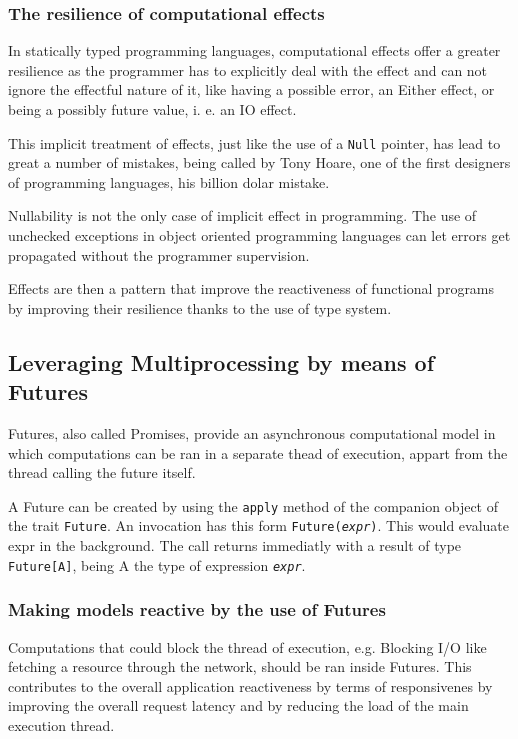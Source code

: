 \documentclass[../main.tex]{subfiles}
\begin{document}
\subsubsection{The resilience of computational effects}
In statically typed programming languages, computational effects offer a greater resilience as the
programmer has to explicitly deal with the effect and can not ignore the
effectful nature of it, like having a possible error, an Either effect, or being a possibly
future value, i. e. an IO effect.

This implicit treatment of effects, just like the use of a \texttt{Null} pointer, has
lead to great a number of mistakes, being called by Tony Hoare, one of the first designers of
programming languages, his billion dolar mistake.

Nullability is not the only case of implicit effect in programming. The use of unchecked
exceptions in object oriented programming languages can let errors get propagated
without the programmer supervision.

Effects are then a pattern that improve the reactiveness of functional programs by
improving their resilience thanks to the use of type system.

\subsection{Leveraging Multiprocessing by means of Futures}
Futures, also called Promises, provide an asynchronous computational model in
which computations can be ran in a separate thead of execution, appart from the
thread calling the future itself.

A Future can be created by using the \texttt{apply} method of the companion object
of the trait \texttt{Future}. An invocation has this form
\texttt{Future(\textit{expr})}. This would evaluate expr in the background. The
call returns immediatly with a result of type \texttt{Future[A]}, being A the type
of expression \texttt{\textit{expr}}.

\subsubsection{Making models reactive by the use of Futures}

Computations that could block the thread of execution, e.g. Blocking I/O like
fetching a resource through the network, should be ran inside Futures. This
contributes to the overall application reactiveness by terms of responsivenes by
improving the overall request latency and by reducing the load of the main
execution thread.
\end{document}
